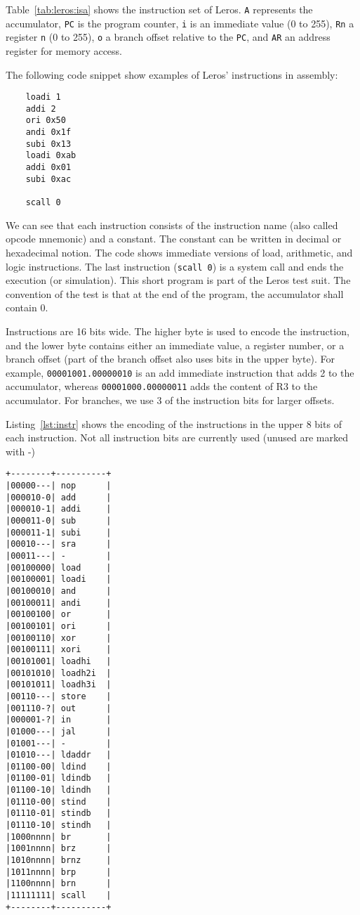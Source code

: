 \documentclass[%
    10pt,
    headinclude, footexclude,
    openright, %
    notitlepage,
    cleardoubleempty,
    headsepline,
    pointlessnumbers,
    bibtotoc, idxtotoc,
    ]{scrbook}
\newcommand{\code}[1]{{\lstinline[basicstyle=\small\ttfamily]{#1}}}
\begin{document}
Table~\ref{tab:leros:isa} shows the instruction set of Leros.
\code{A} represents the accumulator, \code{PC} is the program counter,
\code{i} is an immediate value (0 to 255), \code{Rn} a register
\code{n} (0 to 255), \code{o} a branch offset relative to the \code{PC},
and \code{AR} an address register for memory access.

The following code snippet show examples of Leros' instructions in assembly:

\begin{verbatim}
	loadi 1
	addi 2
	ori 0x50
	andi 0x1f
	subi 0x13
	loadi 0xab
	addi 0x01
	subi 0xac

	scall 0
\end{verbatim}

\noindent We can see that each instruction consists of the instruction name (also called
opcode mnemonic) and a constant. The constant can be written in decimal or
hexadecimal notion. The code shows immediate versions of load, arithmetic,
and logic instructions. The last instruction (\code{scall 0}) is a system call and
ends the execution (or simulation).
This short program is part of the Leros test suit.
The convention of the test is that at the end of the program, the accumulator shall
contain 0.

Instructions are 16 bits wide. The higher byte is used to encode the instruction,
and the lower byte contains either an immediate value, a register number,
or a branch offset (part of the branch offset also uses bits in the upper byte).
For example, \code{00001001.00000010} is an add immediate instruction
that adds 2 to the accumulator, whereas \code{00001000.00000011} adds the
content of R3 to the accumulator. For branches, we use 3 of the instruction
bits for larger offsets.

Listing~\ref{lst:instr} shows the encoding of the instructions in the upper 8 bits of
each instruction.
Not all instruction bits are currently used (unused are marked with -)

\begin{lstlisting}[float, caption=Leros instruction encoding., label=lst:instr, frame=tb, captionpos=b]
+--------+----------+
|00000---| nop      |
|000010-0| add      |
|000010-1| addi     |
|000011-0| sub      |
|000011-1| subi     |
|00010---| sra      |
|00011---| -        |
|00100000| load     |
|00100001| loadi    |
|00100010| and      |
|00100011| andi     |
|00100100| or       |
|00100101| ori      |
|00100110| xor      |
|00100111| xori     |
|00101001| loadhi   |
|00101010| loadh2i  |
|00101011| loadh3i  |
|00110---| store    |
|001110-?| out      |
|000001-?| in       |
|01000---| jal      |
|01001---| -        |
|01010---| ldaddr   |
|01100-00| ldind    |
|01100-01| ldindb   |
|01100-10| ldindh   |
|01110-00| stind    |
|01110-01| stindb   |
|01110-10| stindh   |
|1000nnnn| br       |
|1001nnnn| brz      |
|1010nnnn| brnz     |
|1011nnnn| brp      |
|1100nnnn| brn      |
|11111111| scall    |
+--------+----------+
\end{lstlisting}
\end{document}
